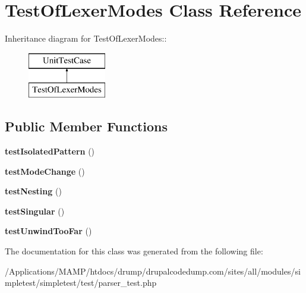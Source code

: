 \hypertarget{class_test_of_lexer_modes}{
\section{TestOfLexerModes Class Reference}
\label{class_test_of_lexer_modes}
}
Inheritance diagram for TestOfLexerModes::\begin{figure}[H]
\begin{center}
\leavevmode
\includegraphics[height=2cm]{class_test_of_lexer_modes}
\end{center}
\end{figure}
\subsection*{Public Member Functions}
\begin{DoxyCompactItemize}
\item 
\hypertarget{class_test_of_lexer_modes_a97882668e2f36a24184e26c01dde6f25}{
{\bfseries testIsolatedPattern} ()}
\label{class_test_of_lexer_modes_a97882668e2f36a24184e26c01dde6f25}

\item 
\hypertarget{class_test_of_lexer_modes_acd3b42192fa31b11ac9dca1366998931}{
{\bfseries testModeChange} ()}
\label{class_test_of_lexer_modes_acd3b42192fa31b11ac9dca1366998931}

\item 
\hypertarget{class_test_of_lexer_modes_a8155da1e9d560697868e6887d9f38ef6}{
{\bfseries testNesting} ()}
\label{class_test_of_lexer_modes_a8155da1e9d560697868e6887d9f38ef6}

\item 
\hypertarget{class_test_of_lexer_modes_a39a9d7106a73505c2a1c9d0cd43c968d}{
{\bfseries testSingular} ()}
\label{class_test_of_lexer_modes_a39a9d7106a73505c2a1c9d0cd43c968d}

\item 
\hypertarget{class_test_of_lexer_modes_a5e64f919d90c98d7c3315858bdf05d5a}{
{\bfseries testUnwindTooFar} ()}
\label{class_test_of_lexer_modes_a5e64f919d90c98d7c3315858bdf05d5a}

\end{DoxyCompactItemize}


The documentation for this class was generated from the following file:\begin{DoxyCompactItemize}
\item 
/Applications/MAMP/htdocs/drump/drupalcodedump.com/sites/all/modules/simpletest/simpletest/test/parser\_\-test.php\end{DoxyCompactItemize}
